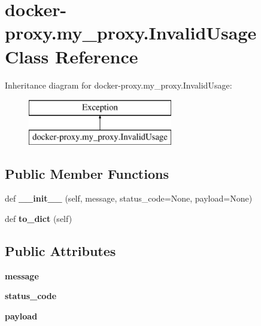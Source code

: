 \hypertarget{classdocker-proxy_1_1my__proxy_1_1_invalid_usage}{}\section{docker-\/proxy.my\+\_\+proxy.\+Invalid\+Usage Class Reference}
\label{classdocker-proxy_1_1my__proxy_1_1_invalid_usage}
Inheritance diagram for docker-\/proxy.my\+\_\+proxy.\+Invalid\+Usage\+:\begin{figure}[H]
\begin{center}
\leavevmode
\includegraphics[height=2.000000cm]{classdocker-proxy_1_1my__proxy_1_1_invalid_usage}
\end{center}
\end{figure}
\subsection*{Public Member Functions}
\begin{DoxyCompactItemize}
\item 
\mbox{\label{classdocker-proxy_1_1my__proxy_1_1_invalid_usage_aa785dfd5e9946eb87e2a94d4544bc656}} 
def {\bfseries \+\_\+\+\_\+init\+\_\+\+\_\+} (self, message, status\+\_\+code=None, payload=None)
\item 
\mbox{\label{classdocker-proxy_1_1my__proxy_1_1_invalid_usage_a50b7849f7141fc1455ace3691a9417a7}} 
def {\bfseries to\+\_\+dict} (self)
\end{DoxyCompactItemize}
\subsection*{Public Attributes}
\begin{DoxyCompactItemize}
\item 
\mbox{\label{classdocker-proxy_1_1my__proxy_1_1_invalid_usage_aa61d504376bb9479db82cb7d97c70011}} 
{\bfseries message}
\item 
\mbox{\label{classdocker-proxy_1_1my__proxy_1_1_invalid_usage_a6503499a33bc2de008fb69c03f453eec}} 
{\bfseries status\+\_\+code}
\item 
\mbox{\label{classdocker-proxy_1_1my__proxy_1_1_invalid_usage_a658b9343c56fde3e1753fe8ad1e1a158}} 
{\bfseries payload}
\end{DoxyCompactItemize}
